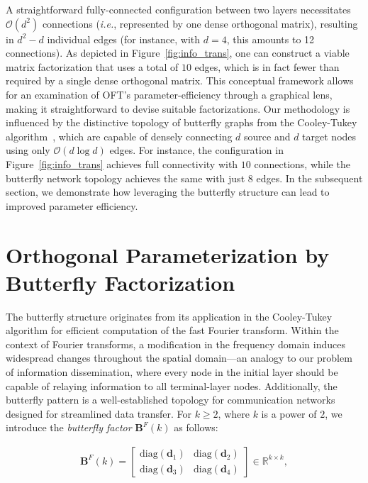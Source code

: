 A straightforward fully-connected configuration between two layers necessitates $\mathcal{O}(d^2)$ connections (\emph{i.e.}, represented by one dense orthogonal matrix), resulting in $d^2-d$ individual edges (for instance, with $d=4$, this amounts to 12 connections). As depicted in Figure~\ref{fig:info_trans}, one can construct a viable matrix factorization that uses a total of $10$ edges, which is in fact fewer than required by a single dense orthogonal matrix. This conceptual framework allows for an examination of OFT's parameter-efficiency through a graphical lens, making it straightforward to devise suitable factorizations. Our methodology is influenced by the distinctive topology of butterfly graphs from the Cooley-Tukey algorithm~\cite{cooley1965algorithm}, which are capable of densely connecting $d$ source and $d$ target nodes using only $\mathcal{O}(d\log d)$ edges. For instance, the configuration in Figure~\ref{fig:info_trans} achieves full connectivity with $10$ connections, while the butterfly network topology achieves the same with just $8$ edges. In the subsequent section, we demonstrate how leveraging the butterfly structure can lead to improved parameter efficiency.

\section{Orthogonal Parameterization by Butterfly Factorization}

The butterfly structure originates from its application in the Cooley-Tukey algorithm for efficient computation of the fast Fourier transform. Within the context of Fourier transforms, a modification in the frequency domain induces widespread changes throughout the spatial domain—an analogy to our problem of information dissemination, where every node in the initial layer should be capable of relaying information to all terminal-layer nodes. Additionally, the butterfly pattern is a well-established topology for communication networks~\cite{solihin2015fundamentals,li2011linear} designed for streamlined data transfer. For $k\geq 2$, where $k$ is a power of $2$, we introduce the \emph{butterfly factor} $\bm{B}^F(k)$ as follows:

\begin{equation}\label{eq:but_factor}
\begin{aligned}
    \bm{B}^F(k)=\begin{bmatrix}
    \text{diag}(\bm{d}_1) & \text{diag}(\bm{d}_2) \\
    \text{diag}(\bm{d}_3) & \text{diag}(\bm{d}_4)
    \end{bmatrix}\in\mathbb{R}^{k\times k},
\end{aligned}
\end{equation}

